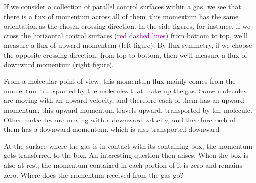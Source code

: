 \documentclass[a4paper,12pt,%
onecolumn,oneside,%
british%
]{memoir}
\renewcommand*{\|}[1][]{\nonscript\:#1\vert\nonscript\:\mathopen{}}
\begin{document}
If we consider a collection of parallel control surfaces within a gas, we see that there is a flux of momentum across all of them; this momentum has the same orientation as the chosen crossing direction. In the side figures, for instance, if we cross the horizontal control surfaces (\textcolor{purple}{red dashed lines}) from bottom to top, we'll measure a flux of upward momentum (left figure). By flux symmetry, if we choose the opposite crossing direction, from top to bottom, then we'll measure a flux of downward momentum (right figure).

From a molecular point of view, this momentum flux mainly comes from the momentum transported by the molecules that make up the gas. Some molecules are moving with an upward velocity, and therefore each of them has an upward momentum; this upward momentum travels upward, transported by the molecule. Other molecules are moving with a downward velocity, and therefore each of them has a downward momentum, which is also transported downward.

\medskip

At the surface where the gas is in contact with its containing box, the momentum gets transferred to the box. An interesting question then arises. When the box is also at rest, the momentum contained in each portion of it is zero and remains zero. Where does the momentum received from the gas go?
\end{document}
